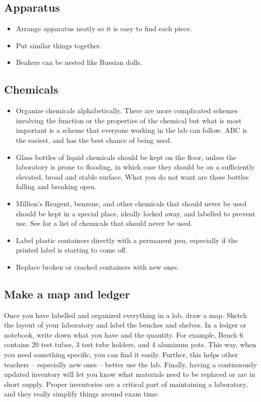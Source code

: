\subsection{Apparatus}
\begin{itemize}
\item{Arrange apparatus neatly so it is easy to find each piece.}
\item{Put similar things together.}
\item{Beakers can be nested like Russian dolls.}
\end{itemize}

\subsection{Chemicals}
\begin{itemize}
\item{Organize chemicals alphabetically. 
There are more complicated schemes involving the function 
or the properties of the chemical but what is most important 
is a scheme that everyone working in the lab can follow. 
ABC is the easiest, 
and has the best chance of being used.}
\item{Glass bottles of liquid chemicals should be kept on the floor, 
unless the laboratory is prone to flooding, 
in which case they should be on a sufficiently elevated, 
broad and stable surface. 
What you do not want are these bottles falling and breaking open.}
\item{Million's Reagent, 
benzene, 
and other chemicals that should never be used should be kept in a special place, 
ideally locked away, 
and labelled to prevent use. 
See  for a list of chemicals that should never be used.}
\item{Label plastic containers directly with a permanent pen, 
especially if the printed label is starting to come off.} 
\item{Replace broken or cracked containers with new ones.}
\end{itemize}

\subsection{Make a map and ledger}
Once you have labelled and organized everything in a lab, 
draw a map. 
Sketch the layout of your laboratory 
and label the benches and shelves. 
In a ledger or notebook, 
write down what you have and the quantity. 
For example, 
Bench 6 contains 20 test tubes, 
3 test tube holders, 
and 4 aluminum pots. 
This way, 
when you need something specific, 
you can find it easily. 
Further, 
this helps other teachers -- especially new ones -- better use the lab. 
Finally, 
having a continuously updated inventory will let you know what 
materials need to be replaced or are in short supply. 
Proper inventories are a critical part of maintaining a laboratory, 
and they really simplify things around exam time.

